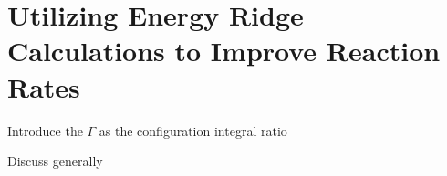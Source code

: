 \section{Utilizing Energy Ridge Calculations to Improve Reaction Rates}
\label{sec:rate-ratio}

\bit
\item Introduce the $\Gamma$ as the configuration integral ratio
\item Discuss generally
\eit

\placeholder
